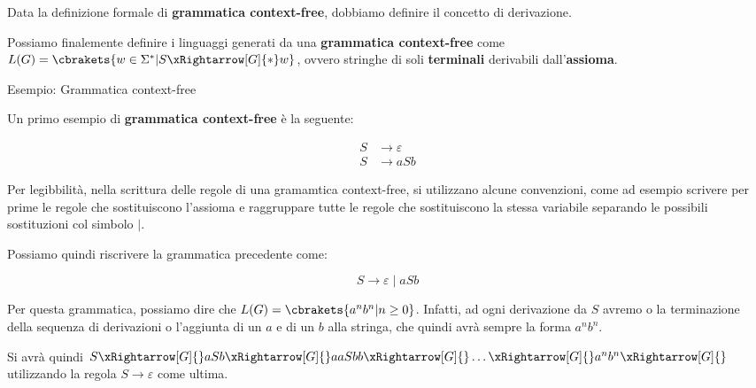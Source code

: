 Data la definizione formale di \textbf{grammatica context-free}, dobbiamo definire il concetto di derivazione.


Possiamo finalemente definire i linguaggi generati da una \textbf{grammatica context-free} come \( L(G) = \cbrakets{w \in \Sigma^* \vert S \xRightarrow[G]{*} w} \), ovvero stringhe di soli \textbf{terminali} derivabili dall'\textbf{assioma}.
\newpage
\begin{generalbox}[colframe=azure-gradient-3!90!black]{Esempio: Grammatica context-free}

  Un primo esempio di \textbf{grammatica context-free} è la seguente:

  \begin{equation}
    \begin{split}
      S &\to \varepsilon\\
      S &\to aSb
    \end{split}
  \end{equation}

  Per legibbilità, nella scrittura delle regole di una gramamtica context-free, si utilizzano alcune convenzioni, come ad esempio scrivere per prime le regole che sostituiscono l'assioma e raggruppare tutte le regole che sostituiscono la stessa variabile separando le possibili sostituzioni col simbolo \(\mid\).

  Possiamo quindi riscrivere la grammatica precedente come:

  \begin{equation}
    S \to \varepsilon \mid aSb
  \end{equation}

  Per questa grammatica, possiamo dire che \(L(G) = \cbrakets{a^{n}b^n \vert n \geq 0} \). Infatti, ad ogni derivazione da \(S\) avremo o la terminazione della sequenza di derivazioni o l'aggiunta di un \(a\) e di un \(b\) alla stringa, che quindi avrà sempre la forma \(a^{n}b^n\).

  Si avrà quindi \(S \xRightarrow[G]{} aSb \xRightarrow[G]{} aaSbb \xRightarrow[G]{} \dots \xRightarrow[G]{} a^{n}b^n \xRightarrow[G]{} \) utilizzando la regola \(S \to \varepsilon \) come ultima.
\end{generalbox}